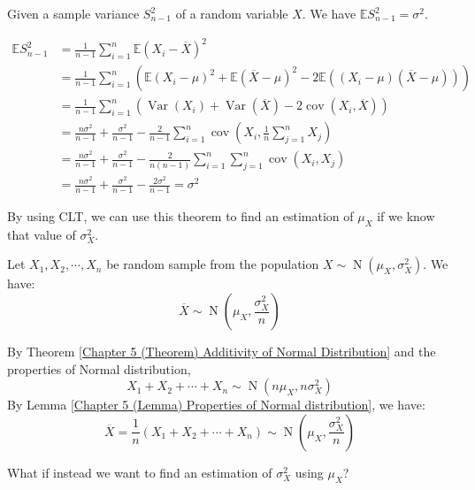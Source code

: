 \documentclass{huhtakm-template-book}
\newcommand{\expect}{\mathbb{E}}
\DeclareMathOperator{\N}{N}
\DeclareMathOperator{\Var}{Var}
\DeclareMathOperator{\cov}{cov}
\begin{document}
\begin{thm}
	Given a sample variance $S_{n-1}^{2}$ of a random variable $X$. We have $\expect{S_{n-1}^{2}}=\sigma^{2}$.
\end{thm}
\begin{proofing}
	\begin{align*}
		\expect{S_{n-1}^{2}}&=\frac{1}{n-1}\sum_{i=1}^{n}\expect(X_{i}-\overline{X})^{2}\\
		&=\frac{1}{n-1}\sum_{i=1}^{n}(\expect(X_{i}-\mu)^{2}+\expect(\overline{X}-\mu)^{2}-2\expect((X_{i}-\mu)(\overline{X}-\mu)))\\
		&=\frac{1}{n-1}\sum_{i=1}^{n}(\Var(X_{i})+\Var(\overline{X})-2\cov(X_{i},\overline{X}))\\
		&=\frac{n\sigma^{2}}{n-1}+\frac{\sigma^{2}}{n-1}-\frac{2}{n-1}\sum_{i=1}^{n}\cov\left(X_{i},\frac{1}{n}\sum_{j=1}^{n}X_{j}\right)\\
		&=\frac{n\sigma^{2}}{n-1}+\frac{\sigma^{2}}{n-1}-\frac{2}{n(n-1)}\sum_{i=1}^{n}\sum_{j=1}^{n}\cov(X_{i},X_{j})\\
		&=\frac{n\sigma^{2}}{n-1}+\frac{\sigma^{2}}{n-1}-\frac{2\sigma^{2}}{n-1}=\sigma^{2}
	\end{align*}
\end{proofing}
By using CLT, we can use this theorem to find an estimation of $\mu_{X}$ if we know that value of $\sigma_{X}^{2}$.
\begin{thm}
	\label{Chapter 7 (Theorem) Sampling distribution with sample mean}
	Let $X_{1},X_{2},\cdots,X_{n}$ be random sample from the population $X\sim\N(\mu_{X},\sigma_{X}^{2})$. We have:
	\begin{equation*}
		\overline{X}\sim\N\left(\mu_{X},\frac{\sigma_{X}^{2}}{n}\right)
	\end{equation*}
\end{thm}
\begin{proofing}
	By Theorem \ref{Chapter 5 (Theorem) Additivity of Normal Distribution} and the properties of Normal distribution,
	\begin{equation*}
		X_{1}+X_{2}+\cdots+X_{n}\sim\N(n\mu_{X},n\sigma_{X}^{2})
	\end{equation*}
	By Lemma \ref{Chapter 5 (Lemma) Properties of Normal distribution}, we have:
	\begin{equation*}
		\overline{X}=\frac{1}{n}(X_{1}+X_{2}+\cdots+X_{n})\sim\N\left(\mu_{X},\frac{\sigma_{X}^{2}}{n}\right)
	\end{equation*}
\end{proofing}
What if instead we want to find an estimation of $\sigma_{X}^{2}$ using $\mu_{X}$?
\end{document}
